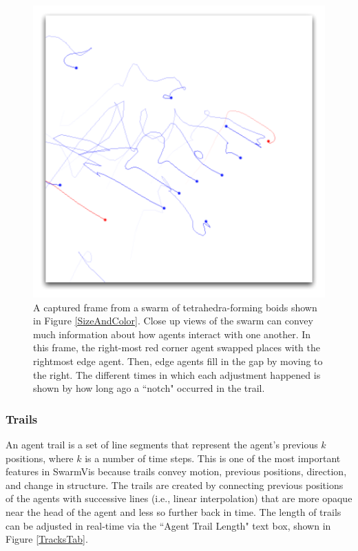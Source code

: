 \documentclass{vgtc}
\begin{document}
\begin{figure}
\centering
\includegraphics[scale=.5]{images/closeuptrails.pdf}
\caption{
A captured frame from a swarm of tetrahedra-forming boids shown in Figure \ref{SizeAndColor}.
Close up views of the swarm can convey much information about how agents interact with one another.
In this frame,  the right-most red corner agent swapped places with the rightmost edge agent.
Then, edge agents fill in the gap by moving to the right. The different times in which each adjustment happened
is shown by how long ago a ``notch" occurred in the trail.}
\label{CloseTrails}
\end{figure}

\subsubsection{Trails}

An agent trail is a set of line segments that represent the agent's previous $k$ positions, where $k$ is a number of time steps.
This is one of the most important features in SwarmVis because trails convey motion, previous positions, direction,
and change in structure.
The trails are created by connecting previous positions of the agents with
successive lines (i.e., linear interpolation) that are more opaque near the head of the agent and less so further back in time.
The length of trails can be adjusted in real-time via the ``Agent Trail Length" text box, shown in
Figure \ref{TracksTab}.
\end{document}
